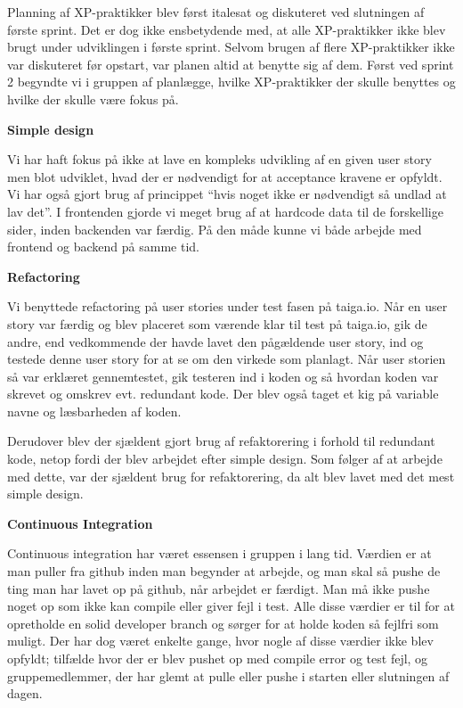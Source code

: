 \documentclass[11pt]{report}
\begin{document}
Planning af XP-praktikker blev først italesat og diskuteret ved slutningen af første sprint. Det er dog ikke ensbetydende med, at alle XP-praktikker ikke blev brugt under udviklingen i første sprint. Selvom brugen af flere XP-praktikker ikke var diskuteret før opstart, var planen altid at benytte sig af dem. Først ved sprint 2 begyndte vi i gruppen af planlægge, hvilke XP-praktikker der skulle benyttes og hvilke der skulle være fokus på.

\noindent\textbf{Simple design}

Vi har haft fokus på ikke at lave en kompleks udvikling af en given user story men blot udviklet, hvad der er nødvendigt for at acceptance kravene er opfyldt. Vi har også gjort brug af princippet “hvis noget ikke er nødvendigt så undlad at lav det”. I frontenden gjorde vi meget brug af at hardcode data til de forskellige sider, inden backenden var færdig. På den måde kunne vi både arbejde med frontend og backend på samme tid.

\noindent\textbf{Refactoring}

Vi benyttede refactoring på user stories under test fasen på taiga.io. Når en user story var færdig og blev placeret som værende klar til test på taiga.io, gik de andre, end vedkommende der havde lavet den pågældende user story, ind og testede denne user story for at se om den virkede som planlagt. Når user storien så var erklæret gennemtestet, gik testeren ind i koden og så hvordan koden var skrevet og omskrev evt. redundant kode. Der blev også taget et kig på variable navne og læsbarheden af koden. 

Derudover blev der sjældent gjort brug af refaktorering i forhold til redundant kode, netop fordi der blev arbejdet efter simple design. Som følger af at arbejde med dette, var der sjældent brug for refaktorering, da alt blev lavet med det mest simple design.

\noindent\textbf{Continuous Integration}

Continuous integration har været essensen i gruppen i lang tid. Værdien er at man puller fra github inden man begynder at arbejde, og man skal så pushe de ting man har lavet op på github, når arbejdet er færdigt. Man må ikke pushe noget op som ikke kan compile eller giver fejl i test. Alle disse værdier er til for at opretholde en solid developer branch og sørger for at holde koden så fejlfri som muligt. Der har dog været enkelte gange, hvor nogle af disse værdier ikke blev opfyldt; tilfælde hvor der er blev pushet op med compile error og test fejl, og gruppemedlemmer, der har glemt at pulle eller pushe i starten eller slutningen af dagen.
\end{document}
